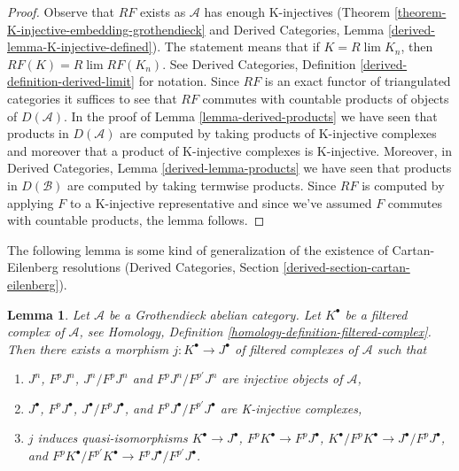 \documentclass{stacks-project}
\theoremstyle{plain}
\newtheorem{lemma}[subsection]{Lemma}
\theoremstyle{definition}
\theoremstyle{remark}
\numberwithin{equation}{subsection}
\def\lim{\mathop{\mathrm{lim}}\nolimits}
\begin{document}
\begin{proof}
Observe that $RF$ exists as $\mathcal{A}$ has enough K-injectives
(Theorem \ref{theorem-K-injective-embedding-grothendieck}
and
Derived Categories, Lemma \ref{derived-lemma-K-injective-defined}).
The statement means that if $K = R\lim K_n$, then
$RF(K) = R\lim RF(K_n)$. See
Derived Categories, Definition \ref{derived-definition-derived-limit}
for notation. Since $RF$ is an exact functor of triangulated
categories it suffices to see that $RF$ commutes with countable
products of objects of $D(\mathcal{A})$. In the proof of
Lemma \ref{lemma-derived-products}
we have seen that products in $D(\mathcal{A})$ are computed by
taking products of K-injective complexes and moreover that a
product of K-injective complexes is K-injective.
Moreover, in Derived Categories, Lemma
\ref{derived-lemma-products}
we have seen that products in $D(\mathcal{B})$ are computed
by taking termwise products.
Since $RF$ is computed by applying $F$ to a K-injective
representative and since we've assumed $F$ commutes with
countable products, the lemma follows.
\end{proof}

\noindent
The following lemma is some kind of generalization of
the existence of Cartan-Eilenberg resolutions
(Derived Categories, Section \ref{derived-section-cartan-eilenberg}).

\begin{lemma}
\label{lemma-K-injective-embedding-filtration}
Let $\mathcal{A}$ be a Grothendieck abelian category.
Let $K^\bullet$ be a filtered complex of $\mathcal{A}$, see
Homology, Definition \ref{homology-definition-filtered-complex}.
Then there exists a morphism $j : K^\bullet \to J^\bullet$
of filtered complexes of $\mathcal{A}$ such that
\begin{enumerate}
\item $J^n$, $F^pJ^n$, $J^n/F^pJ^n$ and $F^pJ^n/F^{p'}J^n$ are injective
objects of $\mathcal{A}$,
\item $J^\bullet$, $F^pJ^\bullet$, $J^\bullet/F^pJ^\bullet$, and
$F^pJ^\bullet/F^{p'}J^\bullet$ are K-injective complexes,
\item $j$ induces quasi-isomorphisms
$K^\bullet \to J^\bullet$,
$F^pK^\bullet \to F^pJ^\bullet$,
$K^\bullet/F^pK^\bullet \to J^\bullet/F^pJ^\bullet$, and
$F^pK^\bullet/F^{p'}K^\bullet \to F^pJ^\bullet/F^{p'}J^\bullet$.
\end{enumerate}
\end{lemma}
\end{document}
